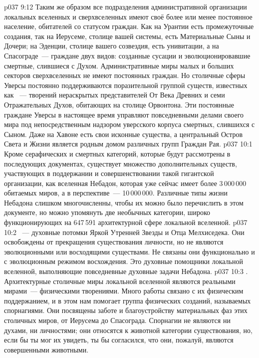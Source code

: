 \vs p037 9:12 \pc Таким же образом все подразделения административной организации локальных вселенных и сверхвселенных имеют своё более или менее постоянное население, обитателей со статусом граждан. Как на Урантии есть промежуточные создания, так на Иерусеме, столице вашей системы, есть Материальные Сыны и Дочери; на Эденции, столице вашего созвездия, есть унивитации, а на Спасограде~--- граждане двух видов: созданные сусации и эволюционировавшие смертные, слившиеся с Духом. Административные миры малых и больших секторов сверхвселенных не имеют постоянных граждан. Но столичные сферы Уверсы постоянно поддерживаются поразительной группой существ, известных как ~--- творений нераскрытых представителей От Века Древних и семи Отражательных Духов, обитающих на столице Орвонтона. Эти постоянные граждане Уверсы в настоящее время управляют повседневными делами своего мира под непосредственным надзором уверсского корпуса смертных, слившихся с Сыном. Даже на Хавоне есть свои исконные существа, а центральный Остров Света и Жизни является родным домом различных групп Граждан Рая.
\vs p037 10:1 Кроме серафических и смертных категорий, которые будут рассмотрены в последующих документах, существует множество дополнительных существ, участвующих в поддержании и совершенствовании такой гигантской организации, как вселенная Небадон, которая уже сейчас имеет более 3\,000\,000 обитаемых миров, а в перспективе~--- 10\,000\,000. Различные типы жизни Небадона слишком многочисленны, чтобы их можно было перечислить в этом документе, но можно упомянуть две необычных категории, широко функционирующих на 647\,591 архитектурной сфере локальной вселенной.
\vs p037 10:2 \pc {}~--- духовные потомки Яркой Утренней Звезды и Отца Мелхиседека. Они освобождены от прекращения существования личности, но не являются эволюционными или восходящими существами. Не связаны они функционально и с эволюционным режимом восхождения. Это духовные помощники локальной вселенной, выполняющие повседневные духовные задачи Небадона.
\vs p037 10:3 \pc {}. Архитектурные столичные миры локальной вселенной являются реальными мирами~--- физическими творениями. Много работы связано с их физическим поддержанием, и в этом нам помогает группа физических созданий, называемых спорнагиями. Они посвящены заботе и благоустройству материальных фаз этих столичных миров, от Иерусема до Спасограда. Спорнагии не являются ни духами, ни личностями; они относятся к животной категории существования, но, если бы ты мог их увидеть, ты бы согласился, что они, пожалуй, являются совершенными животными.

